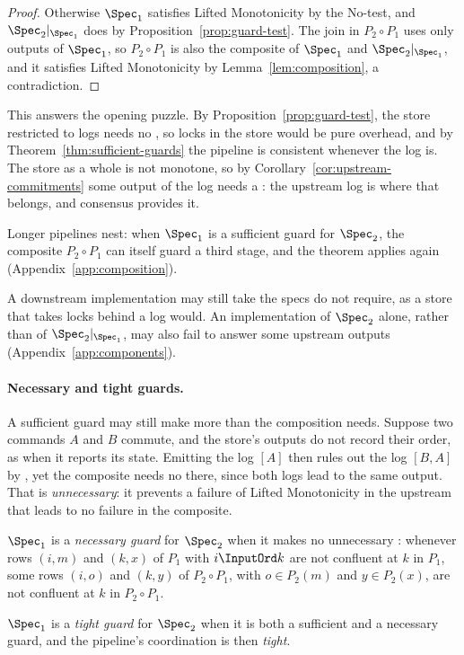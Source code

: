 \begin{proof}
Otherwise $\Spec_1$ satisfies Lifted Monotonicity by the No-\commitment test,
and $\Spec_2|_{\Spec_1}$ does by Proposition~\ref{prop:guard-test}.  The join
in $P_2\circ P_1$ uses only outputs of $\Spec_1$, so $P_2\circ P_1$ is also the
composite of $\Spec_1$ and $\Spec_2|_{\Spec_1}$, and it satisfies Lifted
Monotonicity by Lemma~\ref{lem:composition}, a contradiction.
\end{proof}

This answers the opening puzzle.  By Proposition~\ref{prop:guard-test}, the
store restricted to logs needs no \commitment, so locks in the store would be
pure overhead, and by Theorem~\ref{thm:sufficient-guards} the pipeline is
consistent whenever the log is.  The store as a whole is not monotone, so by
Corollary~\ref{cor:upstream-commitments} some output of the log needs a
\commitment: the upstream log is where that belongs, and consensus provides
it.

Longer pipelines nest: when $\Spec_1$ is a sufficient guard for $\Spec_2$,
the composite $P_2\circ P_1$ can itself guard a third stage, and the theorem applies again
(Appendix~\ref{app:composition}).

A downstream implementation may still take \commitments the specs do not
require, as a store that takes locks behind a log would.  An implementation of
$\Spec_2$ alone, rather than of $\Spec_2|_{\Spec_1}$, may also fail to answer
some upstream outputs (Appendix~\ref{app:components}).

\paragraph{Necessary and tight guards.}
A sufficient guard may still make more \commitments than the composition
needs.  Suppose two commands $A$ and $B$ commute,
and the store's outputs do not record their order, as when it reports its
state.  Emitting the log $[A]$ then rules out the log $[B,A]$ by \commitment,
yet the composite needs no \commitment there, since both logs lead to the same
output.  That \commitment is \emph{unnecessary}: it prevents a
failure of Lifted Monotonicity in the upstream that leads to no failure in the
composite.

\begin{definition}
\label{def:necessary-guard}
\label{def:tight-guard}
$\Spec_1$ is a \emph{necessary guard} for $\Spec_2$ when it makes no
unnecessary \commitment: whenever rows $(i,m)$ and $(k,x)$
of $P_1$ with $i\InputOrd k$ are not confluent at $k$ in $P_1$, some rows
$(i,o)$ and $(k,y)$ of $P_2\circ P_1$, with $o\in P_2(m)$ and $y\in P_2(x)$,
are not confluent at $k$ in $P_2\circ P_1$.

$\Spec_1$ is a \emph{tight guard} for $\Spec_2$ when it is both a
sufficient and a necessary guard, and the pipeline's coordination is then
\emph{tight}.
\end{definition}

